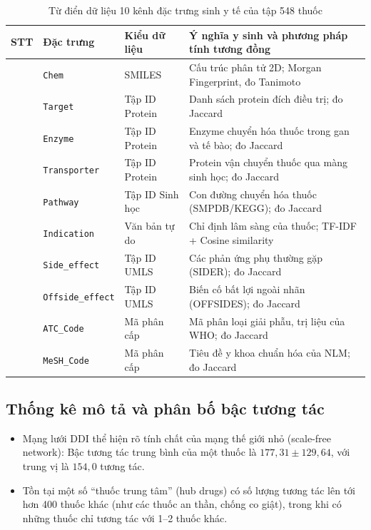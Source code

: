 \documentclass[12pt,a4paper,oneside]{report}
\begin{document}
\begin{table}[H]
  \centering
  \caption{Từ điển dữ liệu 10 kênh đặc trưng sinh y tế của tập 548 thuốc}
  \label{tab:tudien}
  \begin{tabularx}{\textwidth}{>{\centering\arraybackslash}p{1.0cm} p{2.6cm} p{2.4cm} X}
    \toprule
    \textbf{STT} & \textbf{Đặc trưng} & \textbf{Kiểu dữ liệu} & \textbf{Ý nghĩa y sinh và phương pháp tính tương đồng} \\
    \midrule
    1 & \texttt{Chem} & SMILES & Cấu trúc phân tử 2D; Morgan Fingerprint, đo Tanimoto \\
    2 & \texttt{Target} & Tập ID Protein & Danh sách protein đích điều trị; đo Jaccard \\
    3 & \texttt{Enzyme} & Tập ID Protein & Enzyme chuyển hóa thuốc trong gan và tế bào; đo Jaccard \\
    4 & \texttt{Transporter} & Tập ID Protein & Protein vận chuyển thuốc qua màng sinh học; đo Jaccard \\
    5 & \texttt{Pathway} & Tập ID Sinh học & Con đường chuyển hóa thuốc (SMPDB/KEGG); đo Jaccard \\
    6 & \texttt{Indication} & Văn bản tự do & Chỉ định lâm sàng của thuốc; TF-IDF + Cosine similarity \\
    7 & \texttt{Side\_effect} & Tập ID UMLS & Các phản ứng phụ thường gặp (SIDER); đo Jaccard \\
    8 & \texttt{Offside\_effect} & Tập ID UMLS & Biến cố bất lợi ngoài nhãn (OFFSIDES); đo Jaccard \\
    9 & \texttt{ATC\_Code} & Mã phân cấp & Mã phân loại giải phẫu, trị liệu của WHO; đo Jaccard \\
    10 & \texttt{MeSH\_Code} & Mã phân cấp & Tiêu đề y khoa chuẩn hóa của NLM; đo Jaccard \\
    \bottomrule
  \end{tabularx}
\end{table}

\subsection{Thống kê mô tả và phân bố bậc tương tác}
\begin{itemize}
  \item Mạng lưới DDI thể hiện rõ tính chất của mạng thế giới nhỏ (scale-free network): Bậc tương tác trung bình của một thuốc là $177{,}31 \pm 129{,}64$, với trung vị là $154{,}0$ tương tác.
  \item Tồn tại một số ``thuốc trung tâm'' (hub drugs) có số lượng tương tác lên tới hơn 400 thuốc khác (như các thuốc an thần, chống co giật), trong khi có những thuốc chỉ tương tác với 1--2 thuốc khác.
\end{itemize}
\end{document}
